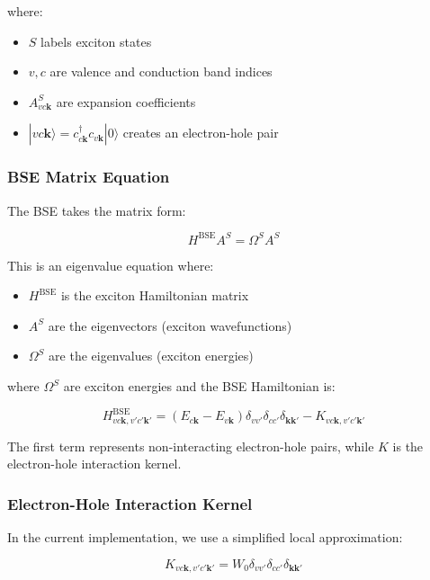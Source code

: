 \documentclass[11pt,a4paper]{article}
\newcommand{\ket}[1]{|#1\rangle}
\begin{document}
where:
\begin{itemize}
    \item $S$ labels exciton states
    \item $v,c$ are valence and conduction band indices
    \item $A^S_{vc\mathbf{k}}$ are expansion coefficients
    \item $\ket{vc\mathbf{k}} = c^\dagger_{c\mathbf{k}} c_{v\mathbf{k}} \ket{0}$ creates an electron-hole pair
\end{itemize}

\subsubsection{BSE Matrix Equation}

The BSE takes the matrix form:

\begin{equation}
H^{\text{BSE}} A^S = \Omega^S A^S
\end{equation}

This is an eigenvalue equation where:
\begin{itemize}
\item $H^{\text{BSE}}$ is the exciton Hamiltonian matrix
\item $A^S$ are the eigenvectors (exciton wavefunctions)
\item $\Omega^S$ are the eigenvalues (exciton energies)
\end{itemize}

where $\Omega^S$ are exciton energies and the BSE Hamiltonian is:

\begin{equation}
H^{\text{BSE}}_{vc\mathbf{k},v'c'\mathbf{k}'} = (E_{c\mathbf{k}} - E_{v\mathbf{k}})\delta_{vv'}\delta_{cc'}\delta_{\mathbf{kk}'} - K_{vc\mathbf{k},v'c'\mathbf{k}'}
\end{equation}

The first term represents non-interacting electron-hole pairs, while $K$ is the electron-hole interaction kernel.

\subsubsection{Electron-Hole Interaction Kernel}

In the current implementation, we use a simplified local approximation:

\begin{equation}
K_{vc\mathbf{k},v'c'\mathbf{k}'} = W_0 \delta_{vv'}\delta_{cc'}\delta_{\mathbf{kk}'}
\end{equation}
\end{document}
